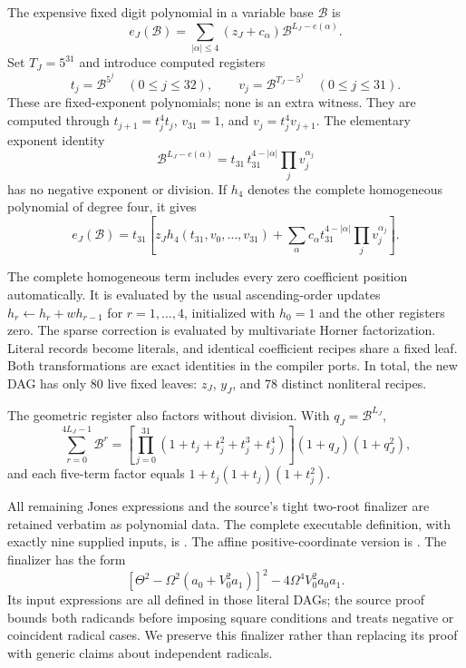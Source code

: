 The expensive fixed digit polynomial in a variable base $\mathcal B$ is
\[
 e_J(\mathcal B)=\sum_{|\alpha|\le4}
                 (z_J+c_\alpha)\mathcal B^{L_J-e(\alpha)}.
\]
Set $T_J=5^{31}$ and introduce computed registers
\[
 t_j=\mathcal B^{5^j}\quad(0\le j\le32),\qquad
 v_j=\mathcal B^{T_J-5^j}\quad(0\le j\le31).
\]
These are fixed-exponent polynomials; none is an extra witness. They are
computed through $t_{j+1}=t_j^4t_j$, $v_{31}=1$, and
$v_j=t_j^4v_{j+1}$. The elementary exponent identity
\[
 \mathcal B^{L_J-e(\alpha)}
 =t_{31}\,t_{31}^{4-|\alpha|}\prod_jv_j^{\alpha_j}
\]
has no negative exponent or division. If $h_4$ denotes the complete
homogeneous polynomial of degree four, it gives
\begin{equation}
 e_J(\mathcal B)=t_{31}\left[
 z_Jh_4(t_{31},v_0,\ldots,v_{31})+
 \sum_\alpha c_\alpha t_{31}^{4-|\alpha|}\prod_jv_j^{\alpha_j}
 \right].\label{eq:homogeneous}
\end{equation}

The complete homogeneous term includes every zero coefficient position
automatically. It is evaluated by the usual ascending-order updates
$h_r\gets h_r+wh_{r-1}$ for $r=1,\ldots,4$, initialized with $h_0=1$
and the other registers zero. The sparse correction is evaluated by
multivariate Horner factorization. Literal records become literals, and
identical coefficient recipes share a fixed leaf. Both transformations are
exact identities in the compiler ports. In total, the new DAG has only
80 live fixed leaves: $z_J$, $y_J$, and 78 distinct nonliteral recipes.

The geometric register also factors without division. With
$q_J=\mathcal B^{L_J}$,
\[
 \sum_{r=0}^{4L_J-1}\mathcal B^r
 =\left[\prod_{j=0}^{31}(1+t_j+t_j^2+t_j^3+t_j^4)\right]
     (1+q_J)(1+q_J^2),
\]
and each five-term factor equals $1+t_j(1+t_j)(1+t_j^2)$.

All remaining Jones expressions and the source's tight two-root finalizer
are retained verbatim as polynomial data. The complete executable
definition, with exactly nine supplied inputs, is
. The affine positive-coordinate
version is .
The finalizer has the form
\[
 [\Theta^2-\Omega^2(a_0+V_0^2a_1)]^2
       -4\Omega^4V_0^2a_0a_1.
\]
Its input expressions are all defined in those literal DAGs; the source
proof bounds both radicands before imposing square conditions and treats
negative or coincident radical cases. We preserve this finalizer rather
than replacing its proof with generic claims about independent radicals.

